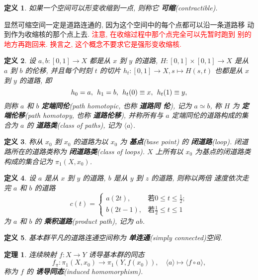 \documentclass[UTF8]{ctexart}
\newtheorem*{thm}{定理}
\newtheorem*{defn}{定义}
\begin{document}
\begin{defn}
如果一个空间可以形变收缩到一点, 则称它 \textbf{可缩}(contractible).
\end{defn}

显然可缩空间一定是道路连通的, 因为这个空间中的每个点都可以沿一条道路移
动到作为收缩核的那个点上去. \textcolor{red}{注意, 在收缩过程中那个点完全可以先暂时跑到
别的地方再跑回来. 换言之, 这个概念不要求它是强形变收缩核.}

\begin{defn}
设 $a,b : [0,1] \to X$ 都是从 $x$ 到 $y$ 的道路, $H : [0,1] \times
[0,1] \to X$ 是从 $a$ 到 $b$ 的伦移, 并且每个时刻 $t$ 的切片 $h_t :
[0,1] \to X, s \mapsto H(s,t)$ 也都是从 $x$ 到 $y$ 的道路, 即
\[
h_0 = a, \hspace{1ex}h_1 = b,\hspace{1ex} h_t(0) \equiv x,\hspace{1ex} h_t(1) \equiv y,
\]
则称 $a$ 和 $b$ \textbf{定端同伦}(path homotopic, 也称 \textbf{道路同
  伦}), 记为 $a \simeq b$, 称 $H$ 为 \textbf{定端伦移}(path homotopy,
也称 \textbf{道路伦移}), 并称所有与 $a$ 定端同伦的道路构成的集合为 $a$
的 \textbf{道路类}(class of paths), 记为 $\langle a \rangle$.
\end{defn}

\begin{defn}
称从 $x_0$ 到 $x_0$ 的道路为以 $x_0$ 为 \textbf{基点}(base point) 的
\textbf{闭道路}(loop). 闭道路所在的道路类称为 \textbf{闭道路类}(class
of loops). $X$ 上所有以 $x_0$ 为基点的闭道路类构成的集合记为 $\pi_1(X,x_0)$.
\end{defn}

\begin{defn}
设 $a$ 是从 $x$ 到 $y$ 的道路, $b$ 是从 $y$ 到 $z$ 的道路, 则称以两倍
速度依次走完 $a$ 和 $b$ 的道路
\[
c(t) =
\begin{cases}
a(2t),     & \text{若} 0 \leq t \leq \frac{1}{2};\\
b(2t - 1), & \text{若} \frac{1}{2} \leq t \leq 1
\end{cases}
\]
为 $a$ 和 $b$ 的 \textbf{乘积道路}(product path), 记为 $ab$.
\end{defn}

\begin{defn}
基本群平凡的道路连通空间称为 \textbf{单连通}(simply connected)空间.
\end{defn}

\begin{thm}
连续映射 $f : X \to Y$ 诱导基本群的同态
\[
f_\pi : \pi_1(X,x_0) \to \pi_1(Y,f(x_0)), \hspace{1em}\langle a
\rangle \mapsto \langle f \circ a \rangle,
\]
称为 $f$ 的 \textbf{诱导同态}(induced homomorphism).
\end{thm}
\end{document}

